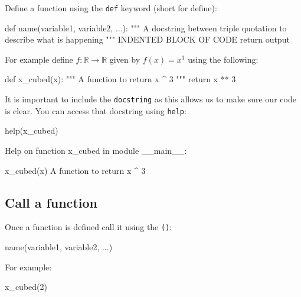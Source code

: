 Define a function using the \texttt{def} keyword (short for define):


\begin{pyin}
def name(variable1, variable2, ...):
    """
    A docstring between triple quotation to describe what is happening
    """
    INDENTED BLOCK OF CODE
    return output
\end{pyin}



For example define \(f:\mathbb{R}\to\mathbb{R}\) given by \(f(x) = x ^
3\) using the following:




\begin{pyin}
def x_cubed(x):
    """
    A function to return x ^ 3
    """
    return x ** 3
\end{pyin}

It is important to include the \texttt{docstring} as this allows us to make sure our
code is clear. You can access that docstring using \texttt{help}:

\begin{pyin}
help(x_cubed)
\end{pyin}





\begin{raw}
Help on function x_cubed in module __main__:

x_cubed(x)
    A function to return x ^ 3
\end{raw}





\subsection{Call a function}
\label{\detokenize{tools-for-mathematics/06-probability/how/main:call-a-function}}

Once a function is defined call it using the \texttt{()}:


\begin{pyin}
name(variable1, variable2, ...)
\end{pyin}



For example:




\begin{pyin}
x_cubed(2)
\end{pyin}






